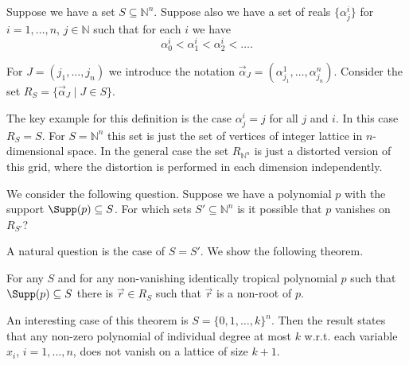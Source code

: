 \documentclass[11pt]{article}
\newcommand{\bb}[1]{\mathbb{#1}}
\begin{document}
Suppose we have a set $S \subseteq \bb{N}^n$.
Suppose also we have a set of reals $\{\alpha^{i}_{j}\}$ for $i=1,\ldots, n$, $j \in \bb{N}$ such that for each $i$ we have 
$$
\alpha^i_0 < \alpha^i_1 < \alpha^i_2 < \ldots . 
$$

For $J=(j_1,\ldots,j_n)$ we introduce the notation $\vec{\alpha}_{J} = (\alpha^{1}_{j_1},\ldots,\alpha^{n}_{j_n})$.
Consider the set $R_S = \{\vec{\alpha}_{J} \mid J \in S\}$.

\begin{remark} 
The key example for this definition is the case $\alpha_{j}^i=j$ for all $j$ and $i$. In this case $R_{S}=S$. For $S=\mathbb{N}^n$ this set is just the set of vertices of integer lattice in $n$-dimensional space. In the general case the set $R_{\mathbb{N}^n}$ is just a distorted version of this grid, where the distortion is performed in each dimension independently.
\end{remark}


We consider the following question. Suppose we have a polynomial $p$ with the support $\Supp(p) \subseteq S$. For which sets $S' \subseteq \bb{N}^n$ is it possible that $p$ vanishes on $R_{S'}$?





A natural question is the case of $S=S'$.
We show the following theorem.

\begin{theorem} \label{thm:combinatorial_null}
For any $S$ and for any non-vanishing identically tropical polynomial $p$ such that $\Supp(p) \subseteq S$ there is $\vec{r} \in R_S$ such that $\vec{r}$ is a non-root of $p$.
\end{theorem}

An interesting case of this theorem is $S = \{0, 1,\ldots, k\}^n$. Then the result states that any non-zero polynomial of individual degree at most $k$ w.r.t. each variable $x_i$, $i=1,\ldots,n$, does not vanish on a lattice of size $k+1$.
\end{document}
